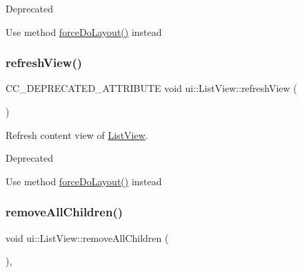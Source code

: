 \begin{DoxyRefDesc}{Deprecated}
\item[\hyperlink{deprecated__deprecated000147}{Deprecated}]Use method \hyperlink{classui_1_1Layout_a280952253418e0951ecdff43172a3c68}{force\+Do\+Layout()} instead \end{DoxyRefDesc}
\mbox{\label{classui_1_1ListView_a2bf4b49c5d219112bf5690b891ea9cad}} 
\subsubsection{\texorpdfstring{refresh\+View()}{refreshView()}\hspace{0.1cm}{\footnotesize\ttfamily [2/2]}}
{\footnotesize\ttfamily C\+C\+\_\+\+D\+E\+P\+R\+E\+C\+A\+T\+E\+D\+\_\+\+A\+T\+T\+R\+I\+B\+U\+TE void ui\+::\+List\+View\+::refresh\+View (\begin{DoxyParamCaption}{ }\end{DoxyParamCaption})}



Refresh content view of \hyperlink{classui_1_1ListView}{List\+View}. 

\begin{DoxyRefDesc}{Deprecated}
\item[\hyperlink{deprecated__deprecated000382}{Deprecated}]Use method \hyperlink{classui_1_1Layout_a280952253418e0951ecdff43172a3c68}{force\+Do\+Layout()} instead \end{DoxyRefDesc}
\mbox{\label{classui_1_1ListView_a7e534825fe60406ed544a254b0975489}} 
\subsubsection{\texorpdfstring{remove\+All\+Children()}{removeAllChildren()}\hspace{0.1cm}{\footnotesize\ttfamily [1/2]}}
{\footnotesize\ttfamily void ui\+::\+List\+View\+::remove\+All\+Children (\begin{DoxyParamCaption}{ }\end{DoxyParamCaption})\hspace{0.3cm}{\ttfamily [override]}, {\ttfamily [virtual]}}

